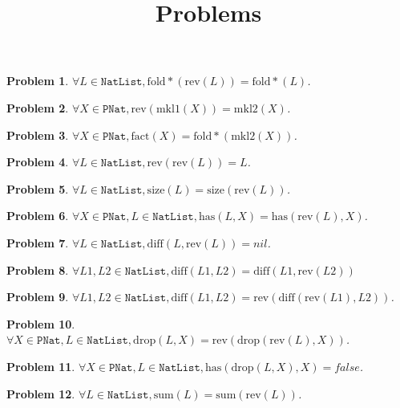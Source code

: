\documentclass[12pt, a4paper]{article}
\title{Problems}
\date{\vspace{-5ex}}
\newtheorem{problem}{Problem}
\newcommand{\rmx}[1]{\mathrm{#1}}
\begin{document}
\maketitle

\begin{problem}
$\forall L \in \mathtt{NatList}, \rmx{fold*}(\rmx{rev}(L)) = \rmx{fold*}(L)$.
\end{problem}

\begin{problem}
$\forall X \in \mathtt{PNat}, \rmx{rev}(\rmx{mkl1}(X)) = \rmx{mkl2}(X)$.
\end{problem}

\begin{problem}
$\forall X \in \mathtt{PNat}, \rmx{fact}(X) = \rmx{fold*}(\rmx{mkl2}(X))$.
\end{problem}

\begin{problem}
$\forall L \in \mathtt{NatList}, \rmx{rev}(\rmx{rev}(L)) = L$.
\end{problem}

\begin{problem}
$\forall L \in \mathtt{NatList}, \rmx{size}(L) = \rmx{size}(\rmx{rev}(L))$.
\end{problem}

\begin{problem}
$\forall X \in \mathtt{PNat}, L \in \mathtt{NatList}, \rmx{has}(L, X) = \rmx{has}(\rmx{rev}(L), X)$.
\end{problem}

\begin{problem}
$\forall L \in \mathtt{NatList}, \rmx{diff}(L, \rmx{rev}(L)) = nil$.
\end{problem}

\begin{problem}
$\forall L1, L2 \in \mathtt{NatList}, \rmx{diff}(L1, L2) = \rmx{diff}(L1, \rmx{rev}(L2))$
\end{problem}

\begin{problem}
$\forall L1, L2 \in \mathtt{NatList}, \rmx{diff}(L1, L2) = \rmx{rev}(\rmx{diff}(\rmx{rev}(L1), L2))$.
\end{problem}

\begin{problem}
$\forall X \in \mathtt{PNat}, L \in \mathtt{NatList}, \rmx{drop}(L, X) = \rmx{rev}(\rmx{drop}(\rmx{rev}(L), X))$.
\end{problem}

\begin{problem}
$\forall X \in \mathtt{PNat}, L \in \mathtt{NatList}, \rmx{has}(\rmx{drop}(L, X), X) = false$.
\end{problem}

\begin{problem}
$\forall L \in \mathtt{NatList}, \rmx{sum}(L) = \rmx{sum}(\rmx{rev}(L))$.
\end{problem}
\end{document}
